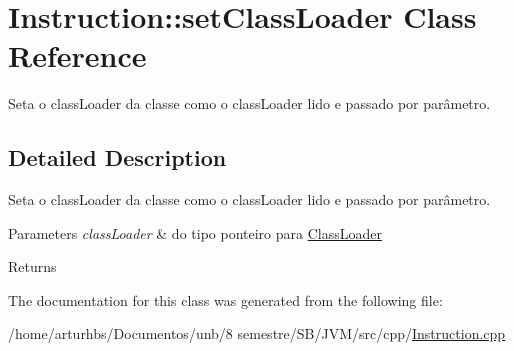 \hypertarget{classInstruction_1_1setClassLoader}{}\section{Instruction\+:\+:set\+Class\+Loader Class Reference}
\label{classInstruction_1_1setClassLoader}


Seta o class\+Loader da classe como o class\+Loader lido e passado por parâmetro.  




\subsection{Detailed Description}
Seta o class\+Loader da classe como o class\+Loader lido e passado por parâmetro. 


\begin{DoxyParams}{Parameters}
{\em class\+Loader} & do tipo ponteiro para \hyperlink{classClassLoader}{Class\+Loader} \\
\hline
\end{DoxyParams}
\begin{DoxyReturn}{Returns}

\end{DoxyReturn}


The documentation for this class was generated from the following file\+:\begin{DoxyCompactItemize}
\item 
/home/arturhbs/\+Documentos/unb/8 semestre/\+S\+B/\+J\+V\+M/src/cpp/\hyperlink{Instruction_8cpp}{Instruction.\+cpp}\end{DoxyCompactItemize}
